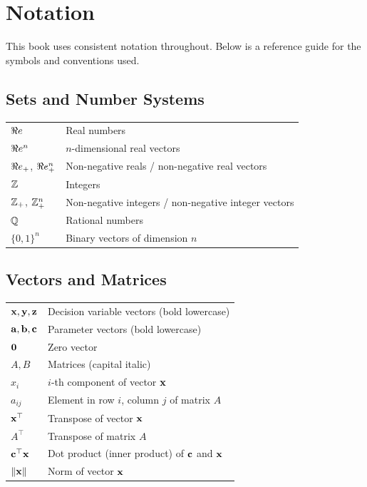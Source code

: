 
\chapter*{Notation}

This book uses consistent notation throughout. Below is a reference guide for the symbols and conventions used.

\section*{Sets and Number Systems}

\begin{tabular}{@{}ll@{}}
$\Re e$ & Real numbers \\
$\Re e^n$ & $n$-dimensional real vectors \\
$\Re e_+$, $\Re e^n_+$ & Non-negative reals / non-negative real vectors \\
$\mathbb{Z}$ & Integers \\
$\mathbb{Z}_+$, $\mathbb{Z}^n_+$ & Non-negative integers / non-negative integer vectors \\
$\mathbb{Q}$ & Rational numbers \\
$\{0,1\}^n$ & Binary vectors of dimension $n$ \\
\end{tabular}

\section*{Vectors and Matrices}

\begin{tabular}{@{}ll@{}}
$\mathbf{x}, \mathbf{y}, \mathbf{z}$ & Decision variable vectors (bold lowercase) \\
$\mathbf{a}, \mathbf{b}, \mathbf{c}$ & Parameter vectors (bold lowercase) \\
$\mathbf{0}$ & Zero vector \\
$A, B$ & Matrices (capital italic) \\
$x_i$ & $i$-th component of vector $\mathbf{x}$ \\
$a_{ij}$ & Element in row $i$, column $j$ of matrix $A$ \\
$\mathbf{x}^\top$ & Transpose of vector $\mathbf{x}$ \\
$A^\top$ & Transpose of matrix $A$ \\
$\mathbf{c}^\top \mathbf{x}$ & Dot product (inner product) of $\mathbf{c}$ and $\mathbf{x}$ \\
$\|\mathbf{x}\|$ & Norm of vector $\mathbf{x}$ \\
\end{tabular}

